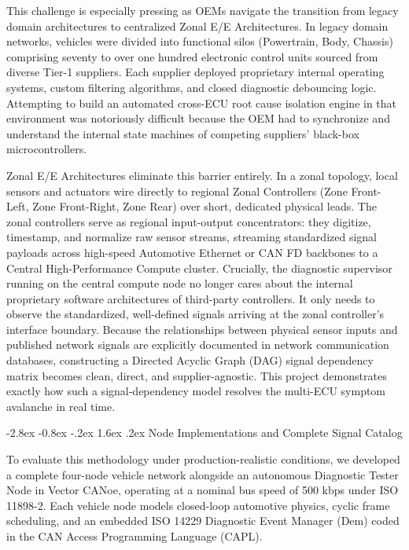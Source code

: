 \documentclass[11pt,a4paper]{article}
\makeatletter
\renewcommand{\section}{\@startsection{section}{1}{\z@}%
  {-2.8ex \@plus -0.8ex \@minus -.2ex}%
  {1.6ex \@plus.2ex}%
  {\normalfont\large\bfseries\color{tatablue}}}
\makeatother
\begin{document}
This challenge is especially pressing as OEMs navigate the transition from legacy domain architectures to centralized Zonal E/E Architectures. In legacy domain networks, vehicles were divided into functional silos (Powertrain, Body, Chassis) comprising seventy to over one hundred electronic control units sourced from diverse Tier-1 suppliers. Each supplier deployed proprietary internal operating systems, custom filtering algorithms, and closed diagnostic debouncing logic. Attempting to build an automated cross-ECU root cause isolation engine in that environment was notoriously difficult because the OEM had to synchronize and understand the internal state machines of competing suppliers' black-box microcontrollers. 

Zonal E/E Architectures eliminate this barrier entirely. In a zonal topology, local sensors and actuators wire directly to regional Zonal Controllers (Zone Front-Left, Zone Front-Right, Zone Rear) over short, dedicated physical leads. The zonal controllers serve as regional input-output concentrators: they digitize, timestamp, and normalize raw sensor streams, streaming standardized signal payloads across high-speed Automotive Ethernet or CAN FD backbones to a Central High-Performance Compute cluster. Crucially, the diagnostic supervisor running on the central compute node no longer cares about the internal proprietary software architectures of third-party controllers. It only needs to observe the standardized, well-defined signals arriving at the zonal controller's interface boundary. Because the relationships between physical sensor inputs and published network signals are explicitly documented in network communication databases, constructing a Directed Acyclic Graph (DAG) signal dependency matrix becomes clean, direct, and supplier-agnostic. This project demonstrates exactly how such a signal-dependency model resolves the multi-ECU symptom avalanche in real time.

\section{Node Implementations and Complete Signal Catalog}

To evaluate this methodology under production-realistic conditions, we developed a complete four-node vehicle network alongside an autonomous Diagnostic Tester Node in Vector CANoe, operating at a nominal bus speed of 500 kbps under ISO 11898-2. Each vehicle node models closed-loop automotive physics, cyclic frame scheduling, and an embedded ISO 14229 Diagnostic Event Manager (Dem) coded in the CAN Access Programming Language (CAPL).
\end{document}
